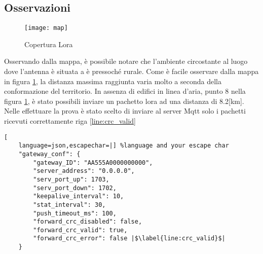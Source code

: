 \subsection{Osservazioni}
\begin{figure}[h]
        \centering 
                \texttt{[image: map]}
        \caption{Copertura Lora}
        \label{fig:map}
\end{figure}
Osservando dalla mappa, è possibile notare che l'ambiente circostante
al luogo dove l'antenna è situata a è pressoché rurale.
Come è facile osservare dalla mappa in figura \ref{fig:map}, la distanza
massima raggiunta varia molto a seconda della conformazione del territorio. In
assenza di edifici in linea d'aria,  punto 8 nella figura \ref{fig:map}, è stato
possibili inviare un pachetto lora ad una distanza di 8.2[km]. Nelle effettuare
la prova è stato scelto di inviare al server Mqtt solo i pachetti ricevuti
correttamente riga \ref{line:crc_valid}
\begin{lstlisting}[
    language=json,escapechar=|] %language and your escape char
    "gateway_conf": {
        "gateway_ID": "AA555A0000000000",
        "server_address": "0.0.0.0",
        "serv_port_up": 1703,
        "serv_port_down": 1702,
        "keepalive_interval": 10,
        "stat_interval": 30,
        "push_timeout_ms": 100,
        "forward_crc_disabled": false,
        "forward_crc_valid": true, 
        "forward_crc_error": false |$\label{line:crc_valid}$|
    }
\end{lstlisting}


